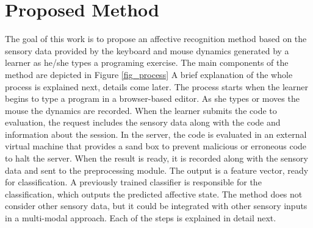 \documentclass[conference]{IEEEtran}
\begin{document}
\section{Proposed Method}
\label{sec:method}

The goal of this work is to propose an affective
recognition method based on the sensory data provided by the keyboard and mouse
dynamics generated by a learner as he/she types a programing exercise. The main
components of the method are depicted in Figure \ref{fig_process} A brief explanation of the
whole process is explained next, details come later. The process starts when the
learner begins to type a program in a browser-based editor. As she types or
moves the mouse the dynamics are recorded. When the learner submits the code to
evaluation, the request includes the sensory data along with the code and
information about the session. In the server, the code is evaluated in an
external virtual machine that provides a sand box to prevent malicious or
erroneous code to halt the server. When the result is ready, it is recorded
along with the sensory data and sent to the preprocessing module. The output is
a feature vector, ready for classification. A previously trained classifier is
responsible for the classification, which outputs the predicted affective state.
The method does not consider other sensory data, but it could be integrated with
other sensory inputs in a multi-modal approach.  Each of the steps is explained
in detail next.
\end{document}
